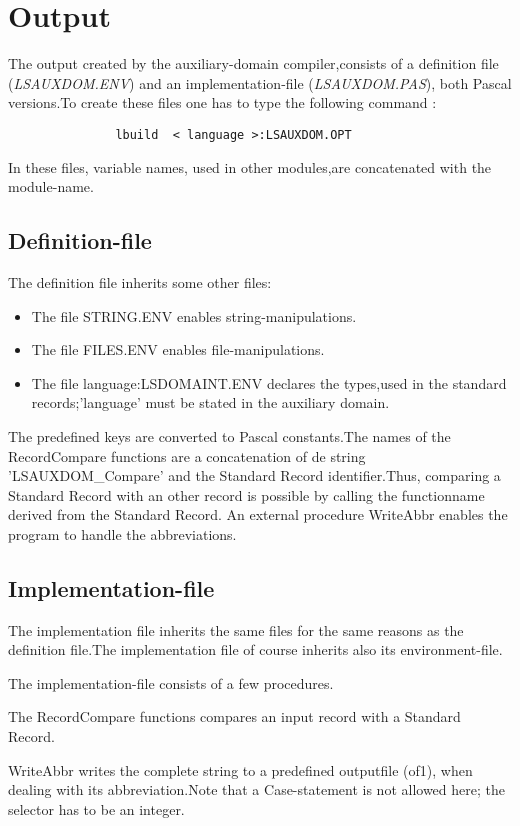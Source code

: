 \section {Output}
The output created by the auxiliary-domain compiler,consists of a definition
file ({\em LSAUXDOM.ENV}) and an implementation-file ({\em LSAUXDOM.PAS}),
both Pascal versions.To create these files one has to type the following
command :
\begin{verbatim}
               lbuild  < language >:LSAUXDOM.OPT

\end{verbatim}

In these files, variable names, used in other modules,are concatenated
with the module-name.
\subsection{Definition-file}
The definition file inherits some other files:
\begin {itemize}
\item The file STRING.ENV enables string-manipulations.
\item The file FILES.ENV enables file-manipulations.
\item The file language:LSDOMAINT.ENV declares the types,used in the standard
records;'language' must be stated in the auxiliary domain.
\end{itemize}
The predefined keys are converted to Pascal constants.The names of the
RecordCompare functions are a concatenation of de string 'LSAUXDOM\_Compare'
and the Standard Record identifier.Thus, comparing a Standard Record with
an other record is possible by calling the functionname derived from the
Standard Record.
An external procedure WriteAbbr enables the program to handle the abbreviations.
\subsection{Implementation-file}
The implementation file inherits the same files for the same reasons
as the definition file.The implementation file of course inherits also its
environment-file.

The implementation-file consists of a few procedures.

The RecordCompare functions compares an input record with a Standard Record.

WriteAbbr writes the complete string to a predefined outputfile (of1),
when dealing with its abbreviation.Note that a Case-statement is not allowed
here; the selector has to be an integer.


